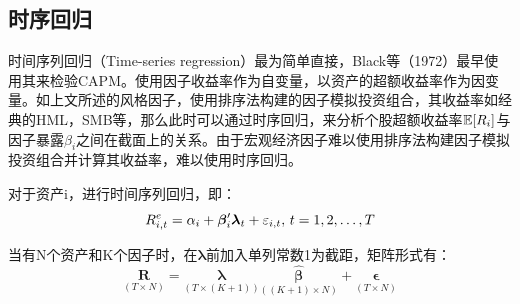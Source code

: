 \documentclass[11pt]{article}
\begin{document}
\subsection{时序回归}

时间序列回归（Time-series regression）最为简单直接，Black等（1972）最早使用其来检验CAPM。使用因子收益率作为自变量，以资产的超额收益率作为因变量。如上文所述的风格因子，使用排序法构建的因子模拟投资组合，其收益率如经典的HML，SMB等，那么此时可以通过时序回归，来分析个股超额收益率$\mathbb{E}[R_i]$与因子暴露$\beta_i$之间在截面上的关系。由于宏观经济因子难以使用排序法构建因子模拟投资组合并计算其收益率，难以使用时序回归。

对于资产i，进行时间序列回归，即：
\begin{equation*}
    R_{i,t}^{e} = \alpha_i + \bm{\beta}_{i}' \bm{\lambda}_t + \varepsilon_{i,t} ,\, t=1,2,\dots,T
\end{equation*}

当有N个资产和K个因子时，在$\bm{\lambda}$前加入单列常数1为截距，矩阵形式有：
\begin{equation*}
    \underset{\scriptscriptstyle{(T \times N)}}{\bm{R}}
    = \underset{\scriptscriptstyle{\left(T \times (K+1)\right)}}{\bm{\lambda}}
    \underset{\scriptscriptstyle{\left((K+1) \times N\right)}}{\hat{\bm{\beta}}} 
    + \underset{\scriptscriptstyle{(T \times N)}}{\bm{\epsilon}}
\end{equation*}
\end{document}
